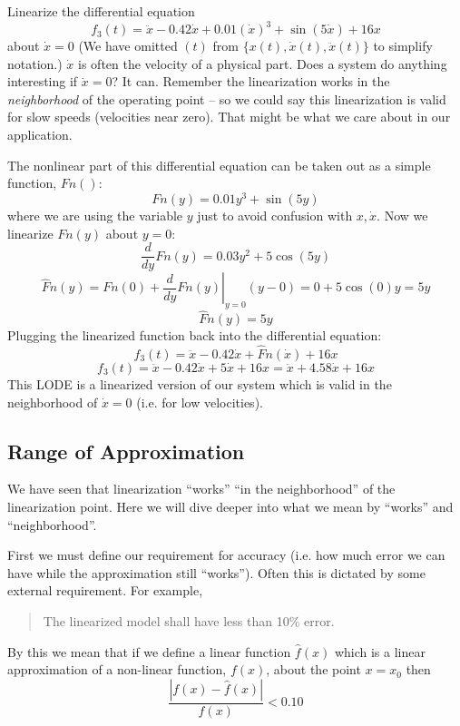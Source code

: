 \newpage\begin{ExampleSmall}
Linearize the differential equation
\[
f_3(t) =   \ddot{x} - 0.42\dot{x} + 0.01(\dot{x})^3 + \sin(5\dot{x}) + 16x
\]
about $\dot{x} = 0$  (We have omitted $(t)$ from $\{x(t), \dot{x}(t),\ddot{x}(t)\}$ to simplify notation.)
$\dot{x}$ is often the velocity of a physical part.
Does a system do anything interesting if $\dot{x} = 0$?  It can.  Remember the linearization works
in the {\it neighborhood} of the operating point -- so we could say this linearization is valid for slow speeds
(velocities near zero).  That might be what we care about in our application.


\vspace{0.2in}
The nonlinear part of this differential equation can be taken out as a simple function, $Fn()$:
\[
Fn(y) = 0.01y^3+\sin(5y)
\]
where we are using the variable $y$ just to avoid confusion with $x,\dot{x}$.   Now we linearize $Fn(y)$ about $y=0$:
\[
\frac{d} {dy}Fn(y)  = 0.03y^2+5\cos(5y)
\]
\[
\hat{F}n(y) = Fn(0) + \left . \frac{d} {dy}Fn(y) \right|_{y=0} (y-0) = 0 + 5\cos(0)y = 5y
\]\[
\hat{F}n(y) = 5y
\]
Plugging the linearized function back into the differential equation:
\[
f_3(t) =   \ddot{x} - 0.42\dot{x} + \hat{F}n(\dot{x}) + 16x
\]
\[
f_3(t) =   \ddot{x} - 0.42\dot{x} + 5\dot{x} + 16x = \ddot{x} + 4.58\dot{x} + 16x
\]
This LODE is a linearized version of our system which is valid in the neighborhood of $\dot{x}=0$ (i.e. for low velocities).
\end{ExampleSmall}


\subsection{Range of Approximation}
We have seen that linearization ``works'' ``in the neighborhood'' of the linearization point.   Here we will dive deeper into what
we mean by ``works'' and ``neighborhood''.

First we must define our requirement for accuracy (i.e. how much error we can have while the approximation still ``works'').
Often this is dictated by some external requirement.  For example,
\begin{quotation}
The linearized model shall have less than 10\% error.
\end{quotation}
By this we mean that if we define a linear function $\hat{f}(x)$ which is a linear approximation of a non-linear function,
$f(x)$, about the point $x = x_0$ then
\[
\frac   {|f(x)-\hat{f}(x)| } {f(x)} < 0.10
\]

